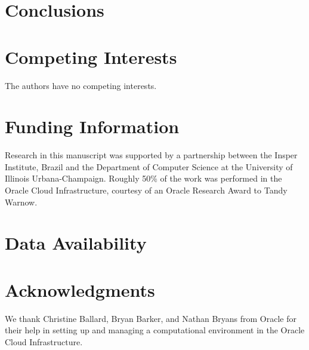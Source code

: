 \documentclass[11pt]{article}   	%
\begin{document}
\section{Conclusions}

\section*{Competing Interests} \vspace{3mm} The authors have no competing interests.

\section*{Funding Information} Research in this manuscript was supported by a partnership between the Insper Institute, Brazil and the Department of Computer Science at the University of Illinois Urbana-Champaign. Roughly
50\% of the work was performed in the Oracle Cloud Infrastructure, courtesy of an Oracle Research Award to Tandy Warnow.

\section*{Data Availability}

\section*{Acknowledgments} We thank Christine Ballard, Bryan Barker, and Nathan Bryans from Oracle for their help in setting up and managing a computational environment in the Oracle Cloud Infrastructure.



\end{document}
